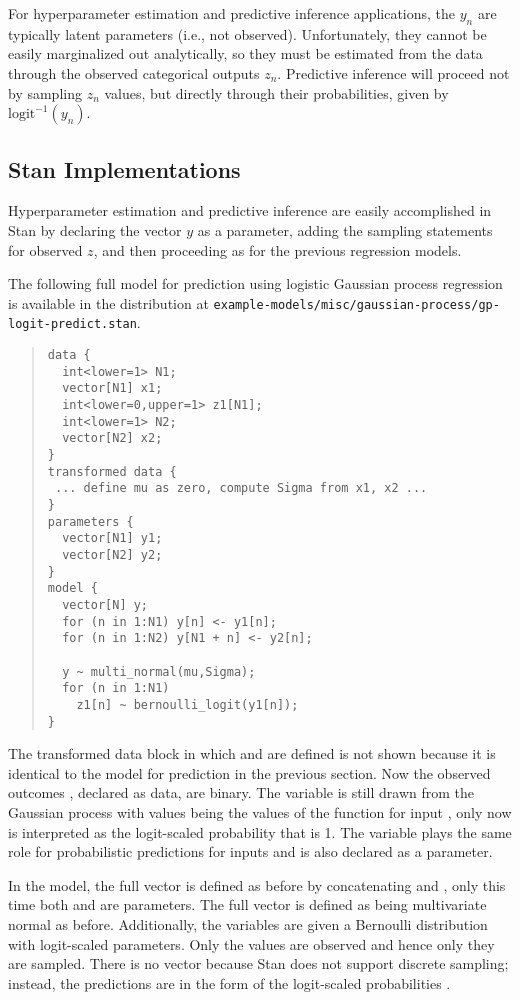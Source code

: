 For hyperparameter estimation and predictive inference applications,
the $y_n$ are typically latent parameters (i.e., not observed).
Unfortunately, they cannot be easily marginalized out analytically,
so they must be estimated from the data through the observed
categorical outputs $z_n$.  Predictive inference will proceed not by
sampling $z_n$ values, but directly through their probabilities, given
by $\mbox{logit}^{-1}(y_n)$.

\subsection{Stan Implementations}

Hyperparameter estimation and predictive inference are easily
accomplished in Stan by declaring the vector $y$ as a parameter,
adding the sampling statements for observed $z$, and then proceeding 
as for the previous regression models.  

The following full model for prediction using logistic Gaussian
process regression is available in the distribution at
\nolinkurl{example-models/misc/gaussian-process/gp-logit-predict.stan}.
%
\begin{quote}
\begin{Verbatim}[fontsize=\small]
data {
  int<lower=1> N1;     
  vector[N1] x1; 
  int<lower=0,upper=1> z1[N1];
  int<lower=1> N2;
  vector[N2] x2;
}
transformed data {
 ... define mu as zero, compute Sigma from x1, x2 ...
}
parameters {
  vector[N1] y1;
  vector[N2] y2;
}
model {
  vector[N] y;
  for (n in 1:N1) y[n] <- y1[n];
  for (n in 1:N2) y[N1 + n] <- y2[n];

  y ~ multi_normal(mu,Sigma);
  for (n in 1:N1)
    z1[n] ~ bernoulli_logit(y1[n]);
}
\end{Verbatim}
\end{quote}
%
The transformed data block in which  and  are
defined is not shown because it is identical to the model for
prediction in the previous section.  Now the observed outcomes
, declared as data, are binary.  The variable  is
still drawn from the Gaussian process with values  being
the values of the function for input , only now
 is interpreted as the logit-scaled probability that
 is 1.  The variable  plays the same role for
probabilistic predictions for inputs  and is also declared as
a parameter.

In the model, the full vector  is defined as before by
concatenating  and , only this time both 
and  are parameters.  The full vector  is defined as
being multivariate normal as before.  Additionally, the 
variables are given a Bernoulli distribution with logit-scaled
parameters.  Only the  values are observed and hence only
they are sampled.  There is no  vector because Stan does
not support discrete sampling; instead, the predictions are in the
form of the logit-scaled probabilities .

